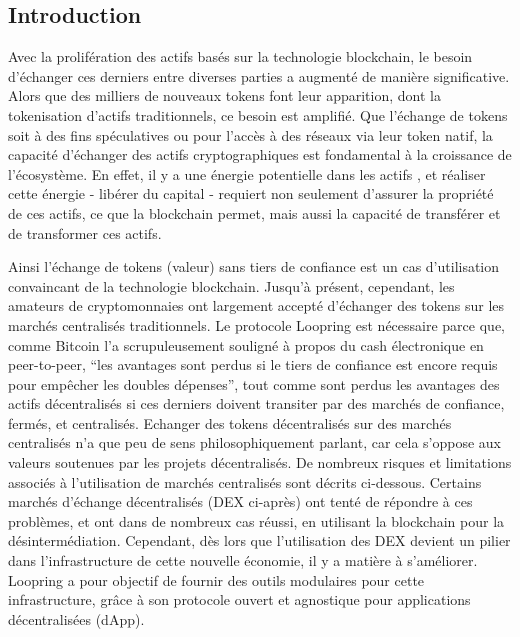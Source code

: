 \documentclass[UTF8,nofonts]{article}
\begin{document}
\begin{multicols}{2}
\section{Introduction\label{sec:introduction}}

Avec la prolifération des actifs basés sur la technologie blockchain, le besoin d'échanger ces derniers entre diverses parties a augmenté de manière significative. Alors que des milliers de nouveaux tokens font leur apparition, dont la tokenisation d'actifs traditionnels, ce besoin est amplifié. Que l'échange de tokens soit à des fins spéculatives ou pour l'accès à des réseaux via leur token natif, la capacité d'échanger des actifs cryptographiques est fondamental à la croissance de l'écosystème. En effet, il y a une énergie potentielle dans les actifs \cite{desotocapital}, et réaliser cette énergie - libérer du capital - requiert non seulement d'assurer la propriété de ces actifs, ce que la blockchain permet, mais aussi la capacité de transférer et de transformer ces actifs.
 
Ainsi l'échange de tokens (valeur) sans tiers de confiance est un cas d'utilisation convaincant de la technologie blockchain. Jusqu'à présent, cependant, les amateurs de cryptomonnaies ont largement accepté d'échanger des tokens sur les marchés centralisés traditionnels. Le protocole Loopring est nécessaire parce que, comme Bitcoin l'a scrupuleusement souligné \cite{nakamoto2008bitcoin} à propos du cash électronique en peer-to-peer, \enquote{les avantages sont perdus si le tiers de confiance est encore requis pour empêcher les doubles dépenses}, tout comme sont perdus les avantages des actifs décentralisés si ces derniers doivent transiter par des marchés de confiance, fermés, et centralisés.
Echanger des tokens décentralisés sur des marchés centralisés n'a que peu de sens philosophiquement parlant, car cela s'oppose aux valeurs soutenues par les projets décentralisés. De nombreux risques et limitations associés à l'utilisation de marchés centralisés sont décrits ci-dessous. Certains marchés d'échange décentralisés (DEX ci-après) \cite{schuh2015bitshares} \cite{bancor} \cite{kyber} ont tenté de répondre à ces problèmes, et ont dans de nombreux cas réussi, en utilisant la blockchain pour la désintermédiation. Cependant, dès lors que l'utilisation des DEX devient un pilier dans l'infrastructure de cette nouvelle économie, il y a matière à s'améliorer. Loopring a pour objectif de fournir des outils modulaires pour cette infrastructure, grâce à son protocole ouvert et agnostique pour applications décentralisées (dApp).


\end{multicols}
\end{document}

